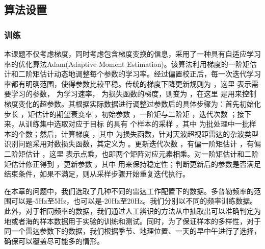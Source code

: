 \subsection{算法设置}

\subsubsection{训练}
本课题不仅考虑梯度，同时考虑包含梯度变换的信息，采用了一种具有自适应学习率的优化算法Adam(Adaptive Moment Estimation)。该算法利用梯度的一阶矩估计和二阶矩估计动态地调整每个参数的学习率。经过偏置校正后，每一次迭代学习率都有明确范围，使得参数比较平稳。传统的梯度下降更新规则为 ，这里 表示需要学习的参数， 为学习速率， 为损失函数的梯度，则变为  ，在这里 是用来控制梯度变化的超参数。其根据实际数据进行调整过参数后的具体步骤为：首先初始化步长  ，矩估计的期望衰变率 ，初始参数 ，一阶矩与二阶矩  ，迭代次数 ；接下来，从训练集中选取对应于目标 的具有 个样本的采样 ，其中 为批处理中一批样本的个数；然后，计算梯度 ，其中 为损失函数，针对天波超视距雷达的杂波类型识别问题采用对数损失函数，其定义为 。更新迭代次数 ，有偏一阶矩估计 ，有偏二阶矩估计 ，这里 表示点乘，也即两个矩阵对应元素相乘。对一阶矩估计和二阶矩估计修正得到 ，更新参数 ，其中 用来保持稳定性；判断更新后的参数是否满足结束条件，如果不满足，则从采样步骤开始重复迭代执行。

在本章的问题中，我们选取了几种不同的雷达工作配置下的数据。多普勒频率的范围可以是-5Hz至5Hz，也可以是-20Hz至20Hz。我们分别以不同的频率训练数据。此外，对于相同频率的数据，我们通过人工辨识的方法从中抽取出可以准确判定为地或者海的样本数据用于实验的训练和测试。同时，为了保证样本的多样性，对于同一个雷达参数下的数据，我们根据季节、地理位置、一天的早中午进行了选择，确保可以覆盖尽可能多的情形。
